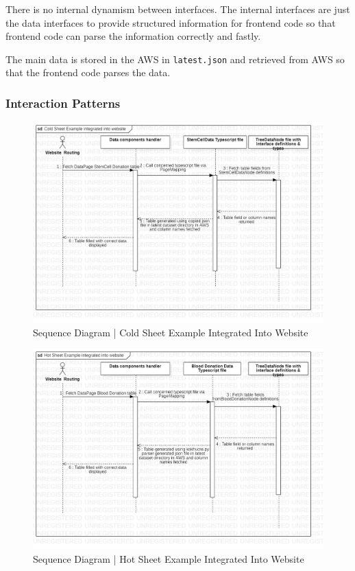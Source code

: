 There is no internal dynamism between interfaces. The internal interfaces are just the data interfaces to provide structured information for frontend code so that frontend code can parse the information correctly and fastly.

The main data is stored in the AWS in \texttt{latest.json} and retrieved from AWS so that the frontend code parses the data.

\subsubsection{Interaction Patterns}

\begin{figure}[H]
  \centering
  \includegraphics[width=\linewidth]{img/sequence-diagram-1.jpg}
  \caption{Sequence Diagram | Cold Sheet Example Integrated Into Website}
\end{figure}

\begin{figure}[H]
  \centering
  \includegraphics[width=\linewidth]{img/sequence-diagram-2.jpg}
  \caption{Sequence Diagram | Hot Sheet Example Integrated Into Website}
\end{figure}

